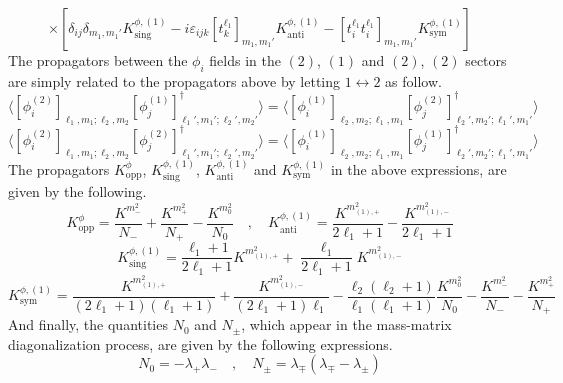 %
%
\begin{equation}
\times
\left[
\delta_{ij} \delta_{m_1,m_1'} K^{\phi,(1)}_{\text{sing}}
- i \varepsilon_{ijk} [t_k^{\ell_1}]_{m_1,m_1'} K^{\phi,(1)}_{\text{anti}}
- [t_i^{\ell_1} t_i^{\ell_1}]_{m_1,m_1'} K^{\phi,(1)}_{\text{sym}}
\right]
\end{equation}
%
%
The propagators between the $\phi_i$ fields in the $(2)$, $(1)$ and $(2)$, $(2)$ sectors are simply related to the propagators above by letting $1 \leftrightarrow 2$ as follow. 
%
%
\begin{equation}\label{phi propagators 12}
\langle [\phi_i^{(2)}]_{\ell_1,m_1;\ell_2,m_2} [\phi_j^{(1)}]_{\ell_1',m_1';\ell_2',m_2'}^\dagger \rangle
=
\langle [\phi_i^{(1)}]_{\ell_2,m_2;\ell_1,m_1} [\phi_j^{(2)}]_{\ell_2',m_2';\ell_1',m_1'}^\dagger \rangle
\end{equation}
%
%
\begin{equation}\label{phi propagators 11}
\langle [\phi_i^{(2)}]_{\ell_1,m_1;\ell_2,m_2} [\phi_j^{(2)}]_{\ell_1',m_1';\ell_2',m_2'}^\dagger \rangle
=
\langle [\phi_i^{(1)}]_{\ell_2,m_2;\ell_1,m_1} [\phi_j^{(1)}]_{\ell_2',m_2';\ell_1',m_1'}^\dagger \rangle
\end{equation}
%
%
The propagators $K^{\phi}_{\text{opp}}$, $K^{\phi,(1)}_{\text{sing}}$, $K^{\phi,(1)}_{\text{anti}}$ and $K^{\phi,(1)}_{\text{sym}}$ in the above expressions, are given by the following.
%
%
\begin{equation}
K^{\phi}_{\text{opp}}
=
\frac{K^{m^2_{-}}}{N_{-}}
+
\frac{K^{m^2_{+}}}{N_{+}}
-
\frac{K^{m^2_{0}}}{N_{0}}
%
\quad , \quad
%
K^{\phi,(1)}_{\mathrm{anti}}
=
\frac{K^{m^2_{(1),+}}}{2 \ell_1 + 1}
-
\frac{K^{m^2_{(1),-}}}{2 \ell_1 + 1}
\end{equation}
%
%
\begin{equation}
K^{\phi,(1)}_{\mathrm{sing}}
=
\frac{\ell_1 + 1}{2 \ell_1 + 1} K^{m^2_{(1),+}}
+
\frac{\ell_1}{2 \ell_1 + 1} K^{m^2_{(1),-}}
\end{equation}
%
%
\begin{equation}
K^{\phi,(1)}_{\mathrm{sym}}
=
\frac{K^{m^2_{(1),+}}}{(2 \ell_1 + 1) (\ell_1 + 1)}
+
\frac{K^{m^2_{(1),-}}}{(2 \ell_1 + 1) \ell_1}
-
\frac{\ell_2 (\ell_2 + 1)}{\ell_1 (\ell_1 + 1)}
\frac{K^{m^2_0}}{N_0}
-
\frac{K^{m^2_{-}}}{N_{-}}
-
\frac{K^{m^2_{+}}}{N_{+}}
\end{equation}
%
%
And finally, the quantities $N_{0}$ and $N_{\pm}$, which appear in the mass-matrix diagonalization process, are given by the following expressions. 
%
%
\begin{equation}
N_0 = -\lambda_{+} \lambda_{-}
%
\quad , \quad
%
N_{\pm} = \lambda_{\mp} (\lambda_{\mp} - \lambda_{\pm})
\end{equation}

